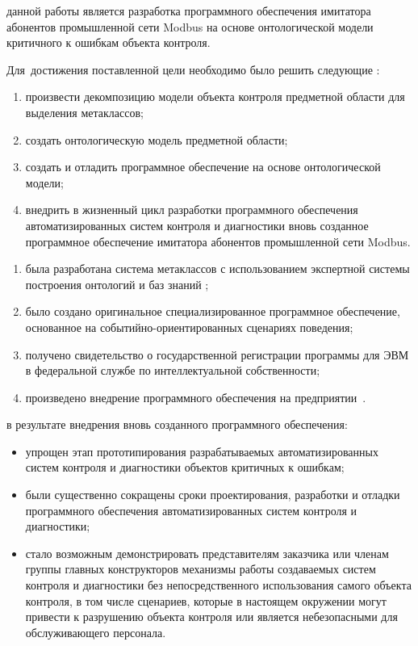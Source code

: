 {\aim} данной работы является разработка программного обеспечения 
  имитатора абонентов промышленной сети Modbus на основе онтологической модели критичного к ошибкам объекта контроля.

Для~достижения поставленной цели необходимо было решить следующие {\tasks}:
\begin{enumerate}
  \item произвести декомпозицию модели объекта контроля предметной области для выделения метаклассов;
  \item создать онтологическую модель предметной области;
  \item создать и отладить программное обеспечение на основе онтологической модели;
  \item внедрить в жизненный цикл разработки программного обеспечения автоматизированных систем контроля и диагностики
        вновь созданное программное обеспечение имитатора абонентов промышленной сети Modbus.
\end{enumerate}


{\novelty}
\begin{enumerate}
  \item была разработана система метаклассов с использованием экспертной системы построения онтологий и баз знаний \protege;
  \item было создано оригинальное специализированное программное обеспечение, основанное на событийно-ориентированных сценариях поведения;
  \item получено свидетельство о государственной регистрации программы для ЭВМ в федеральной службе по интеллектуальной собственности;
  \item произведено внедрение программного обеспечения на предприятии~\leadingOrganizationTitle.
\end{enumerate}

{\influence} в результате внедрения вновь созданного программного обеспечения:
\begin{itemize}
  \item упрощен этап прототипирования разрабатываемых автоматизированных систем контроля и диагностики объектов критичных к ошибкам;
  \item были существенно сокращены сроки проектирования, разработки и отладки программного обеспечения автоматизированных систем контроля и диагностики;
  \item стало возможным демонстрировать представителям заказчика или членам группы главных конструкторов механизмы работы создаваемых систем контроля 
      и диагностики без непосредственного использования самого объекта контроля, в том числе сценариев, которые в настоящем окружении могут привести к разрушению
      объекта контроля или является небезопасными для обслуживающего персонала.
\end{itemize}

